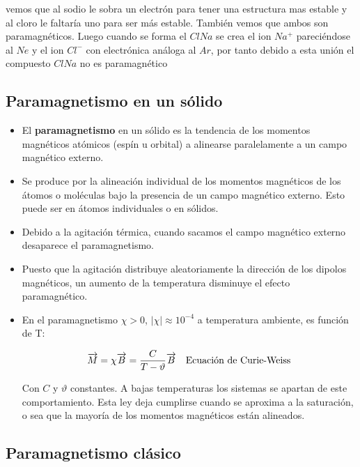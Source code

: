 vemos que al sodio le sobra un electrón para tener una estructura mas estable y al cloro le faltaría uno para ser más estable. También vemos que ambos son paramagnéticos. Luego cuando se forma el $ClNa$ se crea el ion $Na^{+}$ pareciéndose al $Ne$ y el ion $Cl^{-}$ con electrónica análoga al $Ar$, por tanto debido a esta unión el compuesto $ClNa$ no es paramagnético

\subsection{Paramagnetismo en un sólido}


\begin{itemize}
	\item El \textbf{paramagnetismo} en un sólido es la tendencia de los momentos magnéticos atómicos (espín u orbital) a alinearse paralelamente a un campo magnético externo.
	
	\item Se produce por la alineación individual de los momentos magnéticos de los átomos o moléculas bajo la presencia de un campo magnético externo. Esto puede ser en átomos individuales o en sólidos.
	
	\item Debido a la agitación térmica, cuando sacamos el campo magnético externo desaparece el paramagnetismo.
	
	\item Puesto que la agitación distribuye aleatoriamente la dirección de los dipolos magnéticos, un aumento de la temperatura disminuye el efecto paramagnético.
	
	\item En el paramagnetismo $\chi>0$, $|\chi|\approx 10^{-4}$ a temperatura ambiente, es función de T:

	\begin{equation}
  		\overrightarrow{M}=\chi\overrightarrow{B}=\frac{C}{T-\vartheta}\overrightarrow{B} \quad \text{Ecuación de Curie-Weiss}
	\end{equation}

	Con $C$ y $\vartheta$ constantes. A bajas temperaturas los sistemas se apartan de este comportamiento. Esta ley deja cumplirse cuando se aproxima a la saturación, o sea que la mayoría de los momentos magnéticos están alineados.
\end{itemize}


\subsection{Paramagnetismo clásico}

